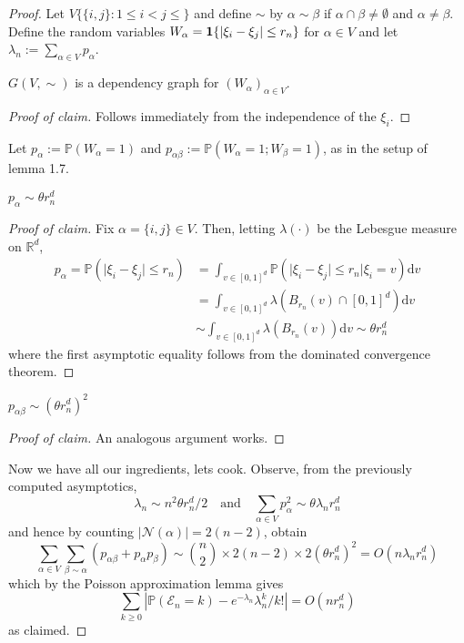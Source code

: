 \documentclass{article}
\begin{document}
\begin{proof}
Let $V \{\{i, j\} : 1 \leq i < j \leq\}$ and define $\sim$ by $\alpha \sim \beta$ if $\alpha \cap \beta \neq \emptyset$ 
and $\alpha \neq \beta$. Define the random variables $W_\alpha = {\bf 1}\{\lvert \xi_i - \xi_j \rvert \leq r_n\}$ for 
$\alpha \in V$ and let $\lambda_n := \sum_{\alpha \in V}p_\alpha$.

\begin{claim}[]{}
    $G(V, \sim)$ is a dependency graph for $(W_\alpha)_{\alpha \in V}$.
\end{claim}

\begin{proof}[Proof of claim]
    Follows immediately from the independence of the $\xi_i$.
\end{proof}

Let $p_\alpha := \mathbb{P}(W_\alpha = 1)$ and $p_{\alpha \beta} := \mathbb{P}(W_\alpha = 1 ; W_\beta = 1)$, as in 
the setup of lemma 1.7.

\begin{claim}[]{}
    $p_\alpha \sim \theta r_n^d$
\end{claim}

\begin{proof}[Proof of claim]
    Fix $\alpha = \{i, j\} \in V$. Then, letting $\lambda(\cdot)$ be the Lebesgue measure on $\mathbb{R}^d$, 
    \begin{align*}
        p_\alpha = \mathbb{P}(\lvert \xi_i - \xi_j \rvert \leq r_n) 
        &= \int_{v \in [0,1]^d} \mathbb{P}(\lvert \xi_i - \xi_j \rvert \leq r_n | \xi_i = v)\mathrm{d}v \\ 
        &= \int_{v \in [0,1]^d} \lambda(B_{r_n}(v) \cap [0,1]^d) \mathrm{d}v \\
        &\sim \int_{v \in [0,1]^d} \lambda(B_{r_n}(v))\mathrm{d}v \sim \theta r_n^d
    \end{align*}
    where the first asymptotic equality follows from the dominated convergence theorem.
\end{proof}

\begin{claim}[]{}
    $p_{\alpha \beta} \sim (\theta r_n^d)^2$
\end{claim}

\begin{proof}[Proof of claim]
    An analogous argument works. 
\end{proof}

Now we have all our ingredients, lets cook. Observe, from the previously computed asymptotics, 
\[\lambda_n \sim n^2\theta r_n^d/2 \quad \text{and} \quad \sum_{\alpha \in V}p_\alpha^2 \sim \theta \lambda_n r_n^d\]
and hence by counting $|\mathcal{N}(\alpha)| = 2(n-2)$, obtain 
\[\sum_{\alpha \in V}\sum_{\beta \sim \alpha}(p_{\alpha \beta} + p_\alpha p_\beta) \sim 
\binom{n}{2} \times 2(n-2) \times 2(\theta r_n^d)^2 = O(n\lambda_n r_n^d)\]
which by the Poisson approximation lemma gives
\[\sum_{k \geq 0}|\mathbb{P}(\mathcal{E}_n = k) - e^{-\lambda_n}\lambda_n^k/k!| = O(nr_n^d)\]  
as claimed. 
\end{proof}
\end{document}

